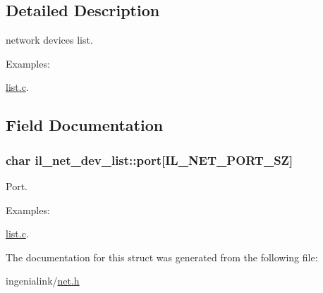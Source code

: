 \subsection{Detailed Description}
network devices list. 

\begin{Desc}
\item[Examples\+: ]\par
\hyperlink{list_8c-example}{list.\+c}.\end{Desc}


\subsection{Field Documentation}
\subsubsection[{\texorpdfstring{port}{port}}]{\setlength{\rightskip}{0pt plus 5cm}char il\+\_\+net\+\_\+dev\+\_\+list\+::port\mbox{[}{\bf I\+L\+\_\+\+N\+E\+T\+\_\+\+P\+O\+R\+T\+\_\+\+SZ}\mbox{]}}\hypertarget{structil__net__dev__list_afda23220e636423e482e27f89fd0535c}{}\label{structil__net__dev__list_afda23220e636423e482e27f89fd0535c}


Port. 

\begin{Desc}
\item[Examples\+: ]\par
\hyperlink{list_8c-example}{list.\+c}.\end{Desc}


The documentation for this struct was generated from the following file\+:\begin{DoxyCompactItemize}
\item 
ingenialink/\hyperlink{net_8h}{net.\+h}\end{DoxyCompactItemize}
